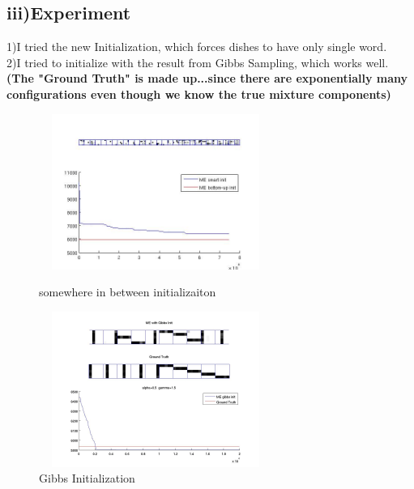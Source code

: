 \documentclass{article}
\begin{document}
\begin{spacing}{1.1}
\subsection{iii)Experiment}
1)I tried the new Initialization, which forces dishes to have only single word.\\
2)I tried to initialize with the result from Gibbs Sampling, which works well.\\
{\bf(The "Ground Truth" is made up...since there are exponentially many 
configurations even though we know the true mixture components)}\\
\begin{figure}[h] 
  \begin{minipage}[b]{0.5\textwidth} 
    \centering 
    \includegraphics[width=3in,height=2in]{new_init.jpg} 
    \caption{somewhere in between initializaiton} 
    \label{fig:by:table} 
  \end{minipage}%
  \begin{minipage}[b]{0.5\textwidth} 
    \centering 
    \includegraphics[width=3in,height=2in]{gibbs_init.jpg} 
    \caption{Gibbs Initialization}
    \label{fig:by:table}  
   \end{minipage}%
\end{figure}


\end{spacing}
\end{document}
